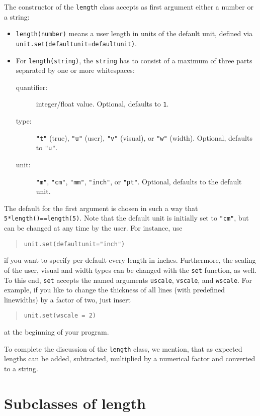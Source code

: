 The constructor of the \verb|length| class accepts as first argument
either a number or a string:
\begin{itemize}
\item \verb|length(number)| means a user length in units of the default
unit, defined via \verb|unit.set(defaultunit=defaultunit)|.
\item For \verb|length(string)|, the \verb|string| has to consist of a
  maximum of three parts separated by one or more whitespaces:
\begin{description}
\item[quantifier:] integer/float value. Optional, defaults to \verb|1|.
\item[type:] \verb|"t"| (true), \verb|"u"| (user), \verb|"v"| (visual), or \verb|"w"| (width).
  Optional, defaults to \verb|"u"|.
\item[unit:] \verb|"m"|, \verb|"cm"|, \verb|"mm"|, \verb|"inch"|, or
  \verb|"pt"|. Optional, defaults to the default unit.
\end{description}
\end{itemize}
The default for the first argument is chosen in such a way that
\texttt{5*length()==length(5)}.  Note that the default unit  is
initially set to \verb|"cm"|, but can be changed at any time by the
user. For instance, use
\begin{quote}
\begin{verbatim}
unit.set(defaultunit="inch")
\end{verbatim}
\end{quote}
if you want to specify per default every length in inches.
Furthermore, the scaling of the user, visual and width types can be
changed with the \verb|set| function, as well. To this end, \verb|set|
accepts the named arguments \verb|uscale|, \verb|vscale|, and
\verb|wscale|. For example, if you like to change the thickness of all
lines (with predefined linewidths) by a factor of two, just insert
\begin{quote}
\begin{verbatim}
unit.set(wscale = 2)
\end{verbatim}
\end{quote}
at the beginning of your program.

To complete the discussion of the \verb|length| class, we mention,
that as expected \PyX{} lengths can be added, subtracted, multiplied by
a numerical factor and converted to a string.

\section{Subclasses of length}

